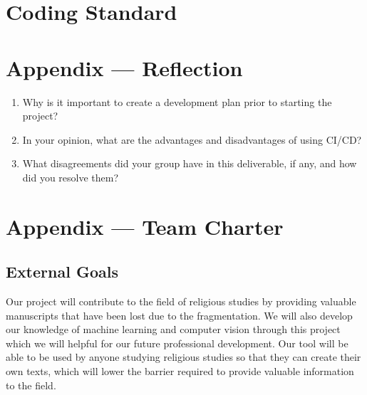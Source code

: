 \documentclass{article}
\begin{document}

\section{Coding Standard}


\newpage{}

\section*{Appendix --- Reflection}




\begin{enumerate}
    \item Why is it important to create a development plan prior to starting the
    project?
    \item In your opinion, what are the advantages and disadvantages of using
    CI/CD?
    \item What disagreements did your group have in this deliverable, if any,
    and how did you resolve them?
\end{enumerate}

\newpage{}

\section*{Appendix --- Team Charter}


\subsection*{External Goals}

Our project will contribute to the field of religious studies by providing valuable manuscripts that have been lost due to the fragmentation. We will also develop our knowledge 
of machine learning and computer vision through this project which we will helpful for our future professional development. Our tool will be able to be used by anyone studying 
religious studies so that they can create their own texts, which will lower the barrier required to provide valuable information to the field.
\end{document}
